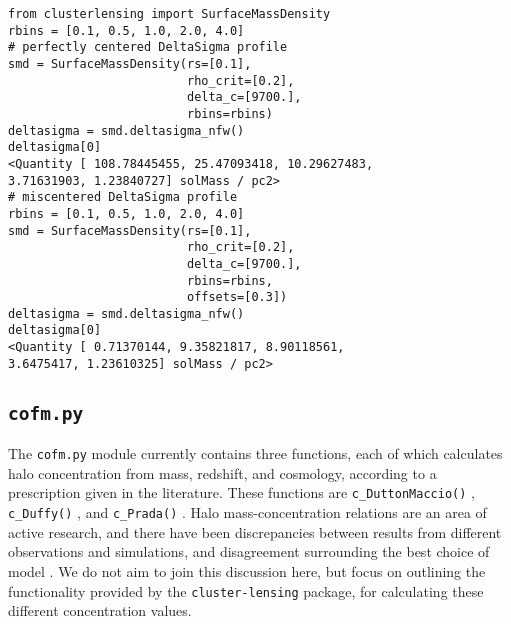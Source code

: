 \documentclass{emulateapj}
\newcommand{\code}{\lstinline[style=codeintext]}
\newcommand{\hcode}{\large\normalfont\texttt} %
\begin{document}
\begin{lstlisting}
from clusterlensing import SurfaceMassDensity
rbins = [0.1, 0.5, 1.0, 2.0, 4.0]
# perfectly centered DeltaSigma profile
smd = SurfaceMassDensity(rs=[0.1], 
                         rho_crit=[0.2], 
                         delta_c=[9700.], 
                         rbins=rbins)
deltasigma = smd.deltasigma_nfw()
deltasigma[0]
<Quantity [ 108.78445455, 25.47093418, 10.29627483, 
3.71631903, 1.23840727] solMass / pc2>
# miscentered DeltaSigma profile
rbins = [0.1, 0.5, 1.0, 2.0, 4.0]
smd = SurfaceMassDensity(rs=[0.1], 
                         rho_crit=[0.2], 
                         delta_c=[9700.], 
                         rbins=rbins,
                         offsets=[0.3])
deltasigma = smd.deltasigma_nfw()
deltasigma[0]
<Quantity [ 0.71370144, 9.35821817, 8.90118561, 
3.6475417, 1.23610325] solMass / pc2>
\end{lstlisting}


\subsection{\hcode{cofm.py}}
\label{cofm}

The \code{cofm.py} module currently contains three functions, each of which calculates halo concentration from mass, redshift, and cosmology, according to a prescription given in the literature. These functions are \code{c_DuttonMaccio()} \citep[for calculations following][]{Dutton14}, \code{c_Duffy()} \citep[following][]{Duffy08}, and \code{c_Prada()} \citep[for][]{Prada12}. Halo mass-concentration relations are an area of active research, and there have been discrepancies between results from different observations and simulations, and disagreement surrounding the best choice of model \citep[see {\emph e.g.}][]{Dutton14, Klypin16}. We do not aim to join this discussion here, but focus on outlining the functionality provided by the \code{cluster-lensing} package, for calculating these different concentration values.

\end{document}
